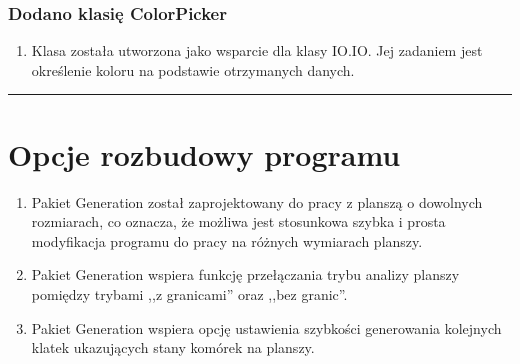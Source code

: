 \documentclass[a4paper,11pt]{article}
\newcommand{\linia}{\rule{\linewidth}{0.4mm}}
\begin{document}
\subsubsection{Dodano klasię ColorPicker}
\begin{enumerate}
\item Klasa została utworzona jako wsparcie dla klasy IO.IO. Jej zadaniem jest określenie koloru na podstawie otrzymanych danych.
\end{enumerate}


\noindent\linia
\section{Opcje rozbudowy programu}
\begin{enumerate}

\item Pakiet Generation został zaprojektowany do pracy z planszą o dowolnych rozmiarach, co oznacza, że możliwa jest stosunkowa szybka i prosta modyfikacja programu do pracy na różnych wymiarach planszy.

\item Pakiet Generation wspiera funkcję przełączania trybu analizy planszy pomiędzy trybami ,,z granicami'' oraz ,,bez granic''.

\item Pakiet Generation wspiera opcję ustawienia szybkości generowania kolejnych klatek ukazujących stany komórek na planszy.

\end{enumerate}
\end{document}
